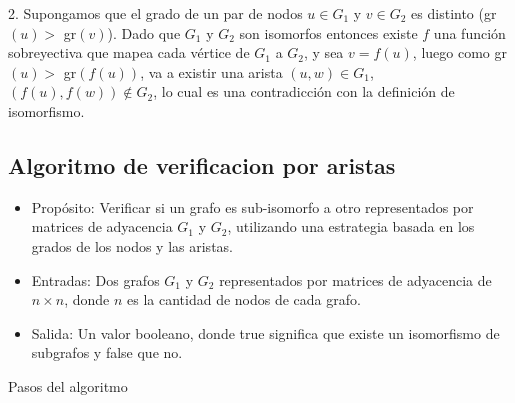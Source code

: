 \documentclass[12pt,a4paper]{article}
\begin{document}
2. Supongamos que el grado de un par de nodos $u \in G_1$ y $v \in G_2$ es distinto (gr$(u) >$ gr$(v)$). Dado que $G_1$ y $G_2$ son isomorfos entonces existe $f$ una función sobreyectiva que mapea cada vértice de $G_1$ a $G_2$, y sea $v = f(u)$, luego como gr$(u) >$ gr$(f(u))$, va a existir una arista $(u,w) \in G_1$, $(f(u),f(w)) \notin G_2$, lo cual es una contradicción con la definición de isomorfismo.

\subsection{Algoritmo de verificacion por aristas}
\begin{itemize}
    \item Propósito: Verificar si un grafo es sub-isomorfo a otro representados por matrices de adyacencia $G_1$ y $G_2$, utilizando una estrategia basada en los grados de los nodos y las aristas.
    \item Entradas: Dos grafos $G_1$ y $G_2$ representados por matrices de adyacencia de $n \times n$, donde $n$ es la cantidad de nodos de cada grafo.
    \item Salida: Un valor booleano, donde true significa que existe un isomorfismo de subgrafos y false que no.
\end{itemize}
Pasos del algoritmo
\end{document}
